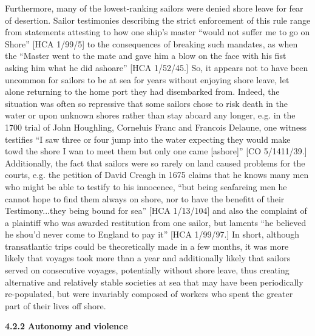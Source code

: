 Furthermore, many of the lowest-ranking sailors were denied shore leave for fear of desertion. Sailor testimonies describing the strict enforcement of this rule range from statements attesting to how one ship’s master “would not suffer me to go on Shore” [HCA 1/99/5] to the consequences of breaking such mandates, as when the “Master went to the mate and gave him a blow on the face with his fist asking him what he did ashoare” [HCA 1/52/45.] So, it appears not to have been uncommon for sailors to be at sea for years without enjoying shore leave, let alone returning to the home port they had disembarked from. Indeed, the situation was often so repressive that some sailors chose to risk death in the water or upon unknown shores rather than stay aboard any longer, e.g. in the 1700 trial of John Houghling, Corneluis Franc and Francois Delaune, one witness testifies “I saw three or four jump into the water expecting they would make towd the shore I wan to meet them but only one came [ashore]” [CO 5/1411/39.] Additionally, the fact that sailors were so rarely on land caused problems for the courts, e.g. the petition of David Creagh in 1675 claims that he knows many men who might be able to testify to his innocence, “but being seafareing men he cannot hope to find them always on shore, nor to have the benefitt of their Testimony...they being bound for sea” [HCA 1/13/104] and also the complaint of a plaintiff who was awarded restitution from one sailor, but laments “he believed he shou’d never come to England to pay it”  [HCA 1/99/97.] In short, although transatlantic trips could be theoretically made in a few months, it was more likely that voyages took more than a year and additionally likely that sailors served on consecutive voyages, potentially without shore leave, thus creating alternative and relatively stable societies at sea that may have been periodically re-populated, but were invariably composed of workers who spent the greater part of their lives off shore. 

  \textbf{4.2.2} \textbf{Autonomy} \textbf{and} \textbf{violence}

